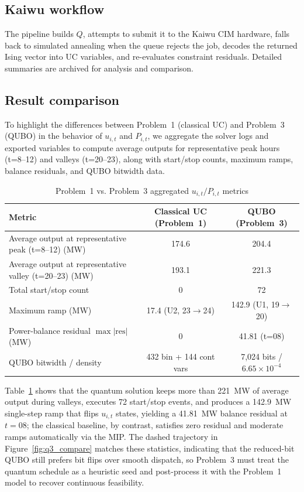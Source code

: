 \documentclass{apmcmthesis}
\begin{document}
\subsection{Kaiwu workflow}
The pipeline builds $Q$, attempts to submit it to the Kaiwu CIM hardware, falls back to simulated annealing when the queue rejects the job, decodes the returned Ising vector into UC variables, and re-evaluates constraint residuals. Detailed summaries are archived for analysis and comparison.

\subsection{Result comparison}
To highlight the differences between Problem~1 (classical UC) and Problem~3 (QUBO) in the behavior of $u_{i,t}$ and $P_{i,t}$, we aggregate the solver logs and exported variables to compute average outputs for representative peak hours (t=8--12) and valleys (t=20--23), along with start/stop counts, maximum ramps, balance residuals, and QUBO bitwidth data.

\begin{table}[htbp]
    \centering
    \caption{Problem~1 vs. Problem~3 aggregated $u_{i,t}/P_{i,t}$ metrics}
    \label{tab:q3_compare}
    \begin{tabular}{@{}>{\raggedright\arraybackslash}p{5.8cm}cc@{}}
        \toprule
        Metric & Classical UC (Problem~1) & QUBO (Problem~3) \\
        \midrule
        Average output at representative peak (t=8--12) (MW) & 174.6 & 204.4 \\
        Average output at representative valley (t=20--23) (MW) & 193.1 & 221.3 \\
        Total start/stop count & 0 & 72 \\
        Maximum ramp (MW) & 17.4 (U2, 23$\rightarrow$24) & 142.9 (U1, 19$\rightarrow$20) \\
        Power-balance residual $\max|\text{res}|$ (MW) & 0 & 41.81 (t=08) \\
        QUBO bitwidth / density & 432 bin + 144 cont vars & 7{,}024 bits / $6.65\times 10^{-4}$ \\
        \bottomrule
    \end{tabular}
\end{table}

\noindent Table~\ref{tab:q3_compare} shows that the quantum solution keeps more than 221~MW of average output during valleys, executes 72 start/stop events, and produces a 142.9~MW single-step ramp that flips $u_{i,t}$ states, yielding a 41.81~MW balance residual at $t=08$; the classical baseline, by contrast, satisfies zero residual and moderate ramps automatically via the MIP. The dashed trajectory in Figure~\ref{fig:q3_compare} matches these statistics, indicating that the reduced-bit QUBO still prefers bit flips over smooth dispatch, so Problem~3 must treat the quantum schedule as a heuristic seed and post-process it with the Problem~1 model to recover continuous feasibility.
\end{document}
